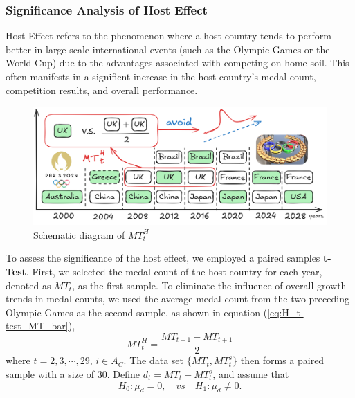 \documentclass{mcmthesis}
\begin{document}
	\subsubsection{Significance Analysis of Host Effect}
	
Host Effect refers to the phenomenon where a host country tends to perform better in large-scale international events (such as the Olympic Games or the World Cup) due to the advantages associated with competing on home soil. This often manifests in a significnt increase in the host country's medal count, competition results, and overall performance.

		\begin{figure}[H]
		\centering
		\includegraphics[width=1\linewidth]{fig/MT.png}
		\caption{Schematic diagram of $MT_t^H$}
		\label{MT}
	\end{figure}
	To assess the significance of the host effect, we employed a paired samples  \textbf{t-Test}. First, we selected the medal count of the host country for each year, denoted as $MT_{t}$, as the first sample. To eliminate the influence of overall growth trends in medal counts, we used the average medal count from the two preceding Olympic Games as the second sample, as shown in equation (\ref{eq:H_t-test_MT_bar}),
	\begin{equation}
		MT^H_{t}=\frac{ MT_{t-1} + MT_{t+1} }{2}
		\label{eq:H_t-test_MT_bar}
	\end{equation}
	where $t=2,3,\cdots,29$, $i\in A_{C}$. 
	The data set $\{MT_{t},MT^s_{t}\}$ then forms a paired sample with a size of 30. 
	Define $d_t= MT_{t} - MT^s_{t}$, and assume that
	\begin{equation*}
		H_0: \mu_d=0, \quad vs \quad H_1:  \mu_d \ne 0.
	\end{equation*}
	
\end{document}
